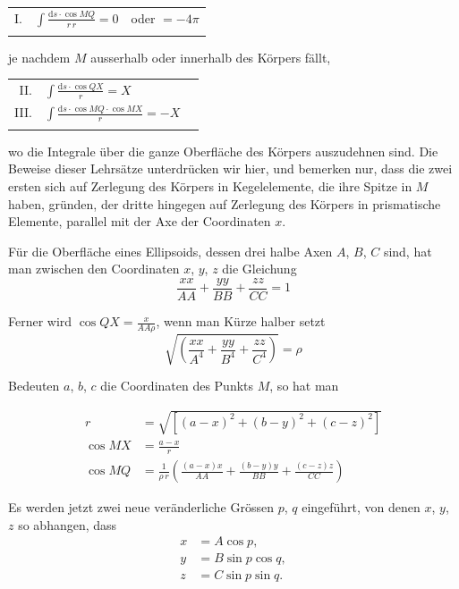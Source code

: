 \documentclass[11pt,a4paper]{article}
\begin{document}
\begin{center}
\begin{tabular}{rp{2cm}l}
I. & $\displaystyle\int\frac{\mathrm{d}s \cdot \cos MQ}{r\,r} = 0$ & oder $= -4\pi$ \\
\addlinespace[6pt]
\end{tabular}
\end{center}
je nachdem $M$ ausserhalb oder innerhalb des Körpers fällt,

\begin{center}
\begin{tabular}{rp{2cm}l}
II. & $\displaystyle\int\frac{\mathrm{d}s \cdot \cos QX}{r} = X$ & \\
\addlinespace[6pt]
III. & $\displaystyle\int\frac{\mathrm{d}s \cdot \cos MQ \cdot \cos MX}{r} = -X$ & \\
\addlinespace[6pt]
\end{tabular}
\end{center}
wo die Integrale über die ganze Oberfläche des Körpers auszudehnen sind. Die Beweise dieser Lehrsätze unterdrücken wir hier, und bemerken nur, dass die zwei ersten sich auf Zerlegung des Körpers in Kegelelemente, die ihre Spitze in $M$ haben, gründen, der dritte hingegen auf Zerlegung des Körpers in prismatische Elemente, parallel mit der Axe der Coordinaten $x$.

Für die Oberfläche eines Ellipsoids, dessen drei halbe Axen $A$, $B$, $C$ sind, hat man zwischen den Coordinaten $x$, $y$, $z$ die Gleichung
\[
\frac{xx}{AA} + \frac{yy}{BB} + \frac{zz}{CC} = 1
\]

Ferner wird $\cos QX = \frac{x}{AA\rho}$, wenn man Kürze halber setzt
\[
\sqrt{\left(\frac{xx}{A^4} + \frac{yy}{B^4} + \frac{zz}{C^4}\right)} = \rho
\]

Bedeuten $a$, $b$, $c$ die Coordinaten des Punkts $M$, so hat man

\newpage
\noindent
\begin{align*}
r &= \sqrt{[(a-x)^2 + (b-y)^2 + (c-z)^2]} \\
\cos MX &= \frac{a-x}{r} \\
\cos MQ &= \tfrac{1}{\rho\,r}\left(\frac{(a-x)x}{AA} + \frac{(b-y)y}{BB} + \frac{(c-z)z}{CC}\right)
\end{align*}

Es werden jetzt zwei neue veränderliche Grössen $p$, $q$ eingeführt, von denen $x$, $y$, $z$ so abhangen, dass
\begin{align*}
x &= A \cos p, \\
y &= B \sin p \cos q, \\
z &= C \sin p \sin q.
\end{align*}
\end{document}
